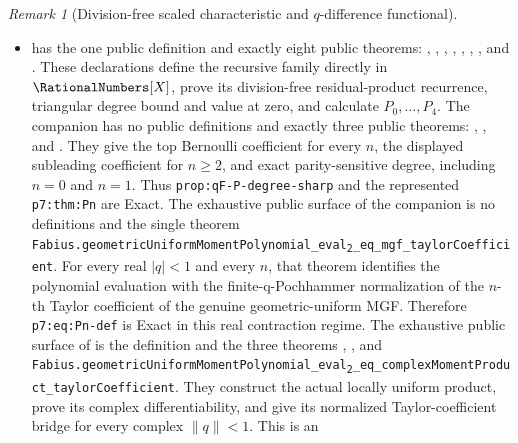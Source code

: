 \documentclass[11pt,oneside]{article}
\theoremstyle{definition}
\theoremstyle{remark}
\newtheorem{remark}[remark]{Remark}
\newcommand{\leansubtwo}[2]{%
  \nolinkurl{#1}\texttt{\textsubscript{2}}\nolinkurl{#2}}
\begin{document}
\begin{remark}[Division-free scaled characteristic and \(q\)-difference functional]
\begin{itemize}
\item {} has the one public
definition  and exactly eight
public theorems:
,
,
,
,
,
,
, and
.  These declarations
define the recursive family directly in \(\RationalNumbers[X]\), prove its
division-free residual-product recurrence, triangular degree bound and value
at zero, and calculate \(P_0,\ldots,P_4\).  The companion
 has no public definitions
and exactly three public theorems:
,
, and
.  They give the
top Bernoulli coefficient for every \(n\), the displayed subleading coefficient
for \(n\ge2\), and exact parity-sensitive degree, including \(n=0\) and
\(n=1\).  Thus \nolinkurl{prop:qF-P-degree-sharp} and the represented
\nolinkurl{p7:thm:Pn} are Exact.  The exhaustive public surface of the
companion  is no
definitions and the single theorem
\leansubtwo{Fabius.geometricUniformMomentPolynomial_eval}{_eq_mgf_taylorCoefficient}.
For every real \(\lvert q\rvert<1\) and every \(n\), that theorem identifies
the polynomial evaluation with the finite-q-Pochhammer normalization of the
\(n\)-th Taylor coefficient of the genuine geometric-uniform MGF.  Therefore
\nolinkurl{p7:eq:Pn-def} is Exact in this real contraction regime.  The
exhaustive public surface of
 is the definition
 and the three theorems
,
, and
\nolinkurl{Fabius.geometricUniformMomentPolynomial_eval}\texttt{\textsubscript{2}}\nolinkurl{_eq_complexMomentProduct_taylorCoefficient}.
They construct the actual locally uniform product, prove its complex
differentiability, and give its normalized Taylor-coefficient bridge for
every complex \(\lVert q\rVert<1\).  This is an

\end{itemize}
\end{remark}
\end{document}
